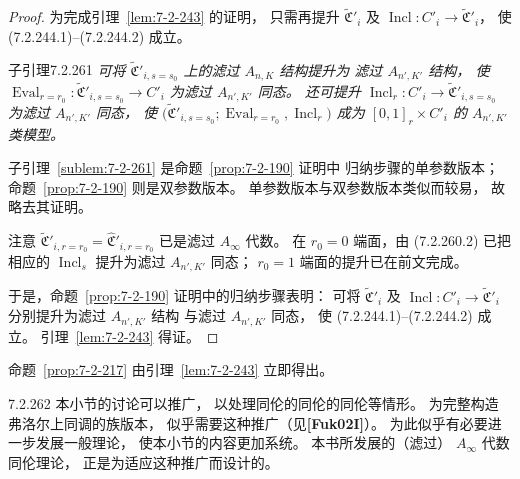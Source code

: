 \begin{proof}
为完成引理~\ref{lem:7-2-243} 的证明，
只需再提升
$\widetilde{\mathfrak C}'_i$
及
$\operatorname{Incl}\colon C'_i\to
\widetilde{\mathfrak C}'_i$，
使 (7.2.244.1)--(7.2.244.2) 成立。

\begin{statement}{子引理}{7.2.261}\label{sublem:7-2-261}\itshape
可将
$\widetilde{\mathfrak C}'_{i,s=s_0}$
上的滤过 $A_{n,K}$ 结构提升为
滤过 $A_{n',K'}$ 结构，
使
$\operatorname{Eval}_{r=r_0}\colon
\widetilde{\mathfrak C}'_{i,s=s_0}
\to C'_i$
为滤过 $A_{n',K'}$ 同态。
还可提升
$\operatorname{Incl}_r\colon C'_i\to
\widetilde{\mathfrak C}'_{i,s=s_0}$
为滤过 $A_{n',K'}$ 同态，
使
$\bigl(\widetilde{\mathfrak C}'_{i,s=s_0};
\operatorname{Eval}_{r=r_0},
\operatorname{Incl}_r\bigr)$
成为 $[0,1]_r\times C'_i$ 的
$A_{n',K'}$ 类模型。
\end{statement}

子引理~\ref{sublem:7-2-261}
是命题~\ref{prop:7-2-190} 证明中
归纳步骤的单参数版本；
命题~\ref{prop:7-2-190} 则是双参数版本。
单参数版本与双参数版本类似而较易，
故略去其证明。

注意
$\widetilde{\mathfrak C}'_{i,r=r_0}
=\widehat{\mathfrak C}'_{i,r=r_0}$
已是滤过 $A_\infty$ 代数。
在 $r_0=0$ 端面，由 (7.2.260.2)
已把相应的 $\operatorname{Incl}_s$
提升为滤过 $A_{n',K'}$ 同态；
$r_0=1$ 端面的提升已在前文完成。

于是，命题~\ref{prop:7-2-190}
证明中的归纳步骤表明：
可将
$\widetilde{\mathfrak C}'_i$
及
$\operatorname{Incl}\colon C'_i\to
\widetilde{\mathfrak C}'_i$
分别提升为滤过 $A_{n',K'}$ 结构
与滤过 $A_{n',K'}$ 同态，
使 (7.2.244.1)--(7.2.244.2) 成立。
引理~\ref{lem:7-2-243} 得证。
\end{proof}

命题~\ref{prop:7-2-217}
由引理~\ref{lem:7-2-243} 立即得出。

\begin{remark}{7.2.262}\label{rem:7-2-262}
本小节的讨论可以推广，
以处理同伦的同伦的同伦等情形。
为完整构造弗洛尔上同调的族版本，
似乎需要这种推广（见\textbf{[Fuk02I]}）。
为此似乎有必要进一步发展一般理论，
使本小节的内容更加系统。
本书所发展的（滤过）
$A_\infty$ 代数同伦理论，
正是为适应这种推广而设计的。
\end{remark}
